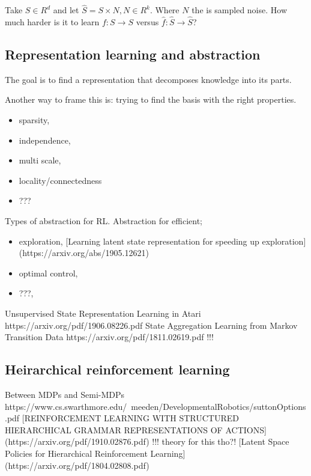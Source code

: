 Take \(S \in R^d\) and let \(\hat S = S \times N, N \in R^k\). Where
\(N\) the is sampled noise. How much harder is it to learn
\(f: S \to S\) versus \(\hat f: \hat S \to \hat S\)?

\cite{Wang2019a,Kaiser2019}

\hypertarget{representation-learning-and-abstraction}{%
\subsection{Representation learning and abstraction}\label{representation-learning-and-abstraction}}

The goal is to find a representation that decomposes knowledge into its
parts.

Another way to frame this is: trying to find the basis with the right
properties.

\begin{itemize}
\tightlist
\item
  sparsity,
\item
  independence,
\item
  multi scale,
\item
  locality/connectedness
\item
  ???
\end{itemize}


Types of abstraction for RL. Abstraction for efficient;

\begin{itemize}
\tightlist
\item
  exploration, [Learning latent state representation for speeding up exploration](https://arxiv.org/abs/1905.12621)
\item
  optimal control,
\item
  ???,
\end{itemize}

Unsupervised State Representation Learning in Atari https://arxiv.org/pdf/1906.08226.pdf
State Aggregation Learning from Markov Transition Data https://arxiv.org/pdf/1811.02619.pdf !!!

\subsection{Heirarchical reinforcement learning}

Between MDPs and Semi-MDPs https://www.cs.swarthmore.edu/~meeden/DevelopmentalRobotics/suttonOptions.pdf
[REINFORCEMENT LEARNING WITH STRUCTURED HIERARCHICAL GRAMMAR REPRESENTATIONS OF ACTIONS](https://arxiv.org/pdf/1910.02876.pdf)  !!! theory for this tho?!
[Latent Space Policies for Hierarchical Reinforcement Learning](https://arxiv.org/pdf/1804.02808.pdf)

